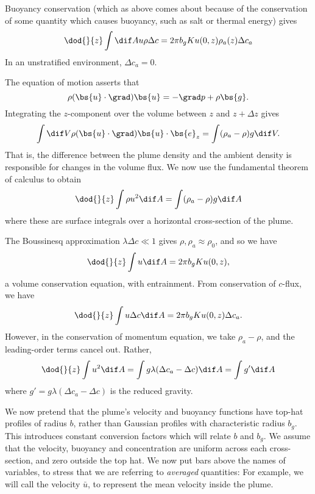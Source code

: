 Buoyancy conservation (which as above comes about because of the conservation of
some quantity which causes buoyancy, such as salt or thermal energy) gives
\begin{equation}
    \dod{}{z} \int \dif A u\rho\Delta c = 2\pi b_g K u(0,z) \rho_a (z) \Delta c_a
\end{equation}
In an unstratified environment, $\Delta c_a = 0$.

The equation of motion asserts that
\begin{equation}
    \rho (\bs{u}\cdot\grad)\bs{u} = -\grad p + \rho\bs{g}.
\end{equation}
Integrating the $z$-component over the volume between $z$ and $z + \Delta z$ gives
\begin{equation}
    \int\dif V \rho (\bs{u}\cdot\grad)\bs{u}\cdot\bs{e}_z = \int (\rho_a - \rho) g \dif V.
\end{equation}
That is, the difference between the plume density and the ambient density is
responsible for changes in the volume flux. We now use the fundamental theorem
of calculus to obtain
\begin{equation}
    \dod{}{z} \int \rho u^2 \dif A = \int (\rho_a - \rho) g \dif A
\end{equation}
where these are surface integrals over a horizontal cross-section of the plume.

The Boussinesq approximation $\lambda\Delta c \ll 1$ gives $\rho,\rho_a \approx
\rho_0$, and so we have
\begin{equation}
    \dod{}{z} \int u \dif A = 2\pi b_g K u(0,z),
\end{equation}
a volume conservation equation, with entrainment. From conservation of $c$-flux,
we have
\begin{equation}
    \dod{}{z} \int u \Delta c \dif A = 2\pi b_g K u(0,z) \Delta c_a.
\end{equation}
However, in the conservation of momentum equation, we take $\rho_a - \rho$, and
the leading-order terms cancel out. Rather,
\begin{equation}
    \dod{}{z} \int u^2 \dif A = \int g \lambda (\Delta c_a - \Delta c) \dif A = \int g' \dif A
\end{equation}
where $g' = g\lambda(\Delta c_a - \Delta c)$ is the reduced gravity.

We now pretend that the plume's velocity and buoyancy functions have top-hat
profiles of radius $b$, rather than Gaussian profiles with characteristic radius
$b_g$. This introduces constant conversion factors which will relate $b$ and
$b_g$. We assume that the velocity, buoyancy and concentration are uniform
across each cross-section, and zero outside the top hat. We now put bars above
the names of variables, to stress that we are referring to \textit{averaged}
quantities: For example, we will call the velocity $\bar{u}$, to represent the
mean velocity inside the plume.

